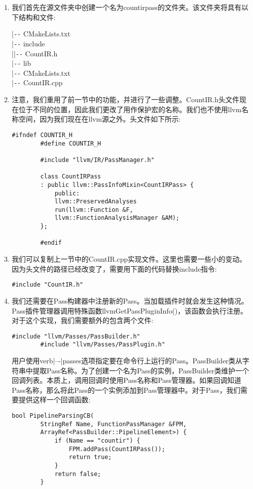 \begin{enumerate}
	\item 我们首先在源文件夹中创建一个名为countirpass的文件夹。该文件夹将具有以下结构和文件:
	\begin{tcolorbox}[colback=white,colframe=black]
		|\verb|--| CMakeLists.txt \\
		|\verb|--| include \\
		|\hspace{1cm}|\verb|--| CountIR.h \\
		|\verb|--| lib \\
		\hspace*{0.8cm}|\verb|--| CMakeLists.txt \\
		\hspace*{0.8cm}|\verb|--| CountIR.cpp
	\end{tcolorbox}
	
	\item 注意，我们重用了前一节中的功能，并进行了一些调整。CountIR.h头文件现在位于不同的位置，因此我们更改了用作保护宏的名称。我们也不使用llvm名称空间，因为我们现在在llvm源之外。头文件如下所示:
	\begin{lstlisting}[caption={}]
		#ifndef COUNTIR_H
		#define COUNTIR_H
		
		#include "llvm/IR/PassManager.h"
		
		class CountIRPass
		: public llvm::PassInfoMixin<CountIRPass> {
			public:
			llvm::PreservedAnalyses
			run(llvm::Function &F,
			llvm::FunctionAnalysisManager &AM);
		};
		
		#endif
	\end{lstlisting}
	
	\item 我们可以复制上一节中的CountIR.cpp实现文件。这里也需要一些小的变动。因为头文件的路径已经改变了，需要用下面的代码替换include指令:
	\begin{lstlisting}[caption={}]
		#include "CountIR.h"
	\end{lstlisting}
	
	\item 我们还需要在Pass构建器中注册新的Pass。当加载插件时就会发生这种情况。Pass插件管理器调用特殊函数llvmGetPassPluginInfo()，该函数会执行注册。对于这个实现，我们需要额外的包含两个文件:
	\begin{lstlisting}[caption={}]
		#include "llvm/Passes/PassBuilder.h"
		#include "llvm/Passes/PassPlugin.h"
	\end{lstlisting}
	用户使用verb|–-|passes选项指定要在命令行上运行的Pass。PassBuilder类从字符串中提取Pass名称。为了创建一个名为Pass的实例，PassBuilder类维护一个回调列表。本质上，调用回调时使用Pass名称和Pass管理器。如果回调知道Pass名称，那么将此Pass的一个实例添加到Pass管理器中。对于Pass，我们需要提供这样一个回调函数:
	\begin{lstlisting}[caption={}]
		bool PipelineParsingCB(
		StringRef Name, FunctionPassManager &FPM,
		ArrayRef<PassBuilder::PipelineElement>) {
			if (Name == "countir") {
				FPM.addPass(CountIRPass());
				return true;
			}
			return false;
		}
	\end{lstlisting}
	

\end{enumerate}
